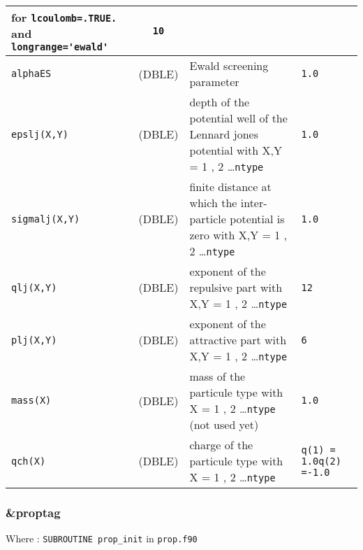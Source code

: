 \documentclass[a4paper]{article}
\begin{document}
\begin{longtable}{l|c|m{8cm}|m{2cm}}
					 for \verb?lcoulomb=.TRUE.? and \verb?longrange='ewald'?  \newline                    & \verb?10? \\
\hline
\rule[-0.75cm]{0cm}{1.5cm}
\verb?alphaES?     &  (DBLE)            & Ewald screening parameter                                                           & \verb?1.0? \\
\hline
\rule[-0.75cm]{0cm}{1.5cm}
\verb?epslj(X,Y)?       &  (DBLE)         & depth of the potential well of the Lennard jones potential with X,Y = 1 , 2 \ldots \verb?ntype?   & \verb?1.0? \\
\hline
\rule[-0.75cm]{0cm}{1.5cm}
\verb?sigmalj(X,Y)?     &  (DBLE)         & finite distance at which the inter-particle potential is zero with 
                                          X,Y = 1 , 2 \ldots \verb?ntype?                                                     & \verb?1.0? \\
\hline
\rule[-0.75cm]{0cm}{1.5cm}
\verb?qlj(X,Y)?    &  (DBLE)            & exponent of the repulsive part with X,Y = 1 , 2 \ldots \verb?ntype?                 & \verb?12? \\
\hline
\rule[-0.75cm]{0cm}{1.5cm}
\verb?plj(X,Y)?    &  (DBLE)            & exponent of the attractive part with X,Y = 1 , 2 \ldots \verb?ntype?                & \verb?6? \\
\hline
\rule[-0.75cm]{0cm}{1.5cm}
\verb?mass(X)?        &  (DBLE)         & mass of the particule type with X = 1 , 2 \ldots \verb?ntype? (not used yet)        & \verb?1.0? \\
\hline
\rule[-0.75cm]{0cm}{1.5cm}
\verb?qch(X)?          &  (DBLE)        & charge of the particule type with X = 1 , 2 \ldots \verb?ntype?                     & \verb?q(1) = 1.0?\newline\verb?q(2) =-1.0?\\
\hline
\hline
\end{longtable}

\subsubsection{\&proptag}

Where : \verb?SUBROUTINE prop_init? in \verb?prop.f90?
\newline
\end{document}
